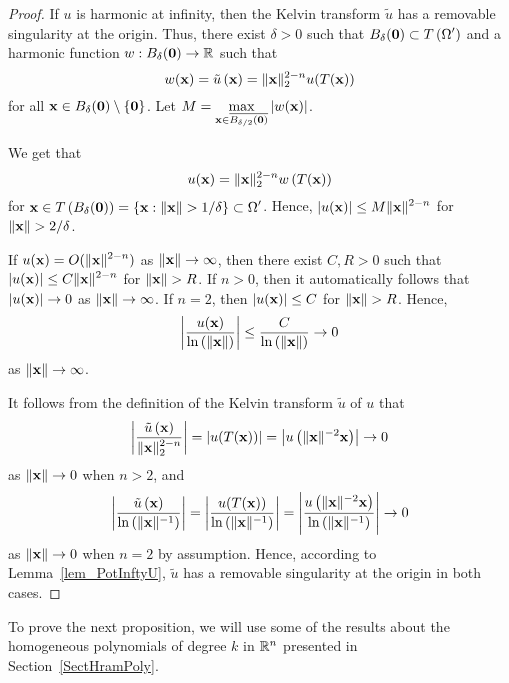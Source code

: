 \begin{proof}
If $u$ is harmonic at infinity, then the Kelvin transform
$\tilde{u}$ has a removable singularity at the origin.  Thus, there
exist $\delta>0$ such that
$\displaystyle B_{\delta}(\mathbf{0}) \subset T\left(\Omega^{\prime}\right)$
and a harmonic function $w: B_{\delta}(\mathbf{0}) \to \mathbb{R}$
such that 
\[
w(\mathbf{x}) = \tilde{u}\left(\mathbf{x}\right)
= \|\mathbf{x}\|_2^{2-n} u(T(\mathbf{x}))
\]
for all $\mathbf{x} \in B_{\delta}(\mathbf{0}) \setminus \{\mathbf{0}\}$.
Let
$\displaystyle M = \max_{\mathbf{x} \in \overline{B_{\delta/2}(\mathbf{0})}}
|w(\mathbf{x})|$.

We get that
\[
u(\mathbf{x}) = \|\mathbf{x}\|_2^{2-n} w\left(T(\mathbf{x})\right)
\]
for $\displaystyle \mathbf{x} \in T\left(B_{\delta}(\mathbf{0})\right)
= \left\{\mathbf{x} : \| \mathbf{x} \| > 1/\delta \right\} \subset \Omega^{\prime}$.
Hence, $\displaystyle | u(\mathbf{x}) | \leq M \|\mathbf{x}\|^{2-n}$ for
$\|\mathbf{x}\| > 2/\delta$.

If $\displaystyle u(\mathbf{x}) = O(\|\mathbf{x}\|^{2-n})$ as
$\|\mathbf{x}\| \rightarrow \infty$, then there exist $C, R >0$ such that
$\displaystyle |u(\mathbf{x})| \leq C \|\mathbf{x}\|^{2-n}$ for $\|\mathbf{x}\| > R$.
If $n>0$, then it automatically follows that
$|u(\mathbf{x})| \to 0$ as $\|\mathbf{x}\| \to \infty$.
If $n=2$, then $\displaystyle |u(\mathbf{x})| \leq C $ for $\|\mathbf{x}\| > R$.
Hence,
\[
  \left| \frac{u(\mathbf{x})}{\ln\left(\|\mathbf{x}\|\right)} \right|
  \leq \frac{C}{\ln\left(\|\mathbf{x}\|\right)} \to 0
\]
as $\|\mathbf{x}\|\to \infty$.

It follows from the definition of the Kelvin transform $\tilde{u}$ of
$u$ that
\[
\left| \frac{\tilde{u}\left(\mathbf{x}\right)}{\|\mathbf{x}\|_2^{2-n}} \right|
= \left| u(T(\mathbf{x})) \right|
= \left| u\left( \|\mathbf{x}\|^{-2}\mathbf{x}\right) \right| \to 0
\]
as $\|\mathbf{x}\| \to 0$ when $n>2$, and
\[
\left| \frac{\tilde{u}\left(\mathbf{x}\right)}{\ln\left(\|\mathbf{x}\|^{-1}\right)}
\right|
= \left| \frac{u(T(\mathbf{x}))}{\ln\left(\|\mathbf{x}\|^{-1}\right)} \right|
= \left| \frac{u\left( \|\mathbf{x}\|^{-2}\mathbf{x}\right)}
{\ln\left(\|\mathbf{x}\|^{-1}\right)} \right| \to 0
\]
as $\|\mathbf{x}\| \to 0$ when $n=2$ by assumption.
Hence, according to Lemma~\ref{lem_PotInftyU}, $\tilde{u}$ has a
removable singularity at the origin in both cases.
\end{proof}

To prove the next proposition, we will use some of the results about the
homogeneous polynomials of degree $k$ in $\mathbb{R}^n$ presented in
Section~\ref{SectHramPoly}.

